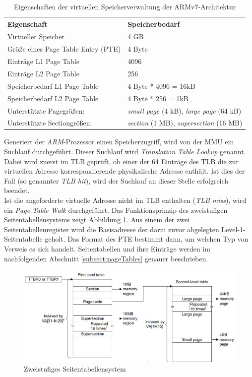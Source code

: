 \begin{table}[H]
\begin{tabular}{p{7cm} | p{7cm}}
  \textbf{Eigenschaft} & \textbf{Speicherbedarf} \\ \hline
  Virtueller Speicher & 4 GB\\  
  Größe eines Page Table Entry (PTE) & 4 Byte \\
  Einträge L1 Page Table & 4096\\
  Einträge L2 Page Table & 256\\
  Speicherbedarf L1 Page Table & 4 Byte * 4096 = 16kB \\
  Speicherbedarf L2 Page Table & 4 Byte * 256 = 1kB\\
  Unterstützte Pagegrößen: & \emph{small page} (4 kB), \emph{large page} (64 kB)\\
  Unterstützte Sectiongrößen: & \emph{section} (1 MB), \emph{supersection} (16 MB)\\
 \end{tabular}
 \caption{Eigenschaften der virtuellen Speicherverwaltung der ARMv7-Architektur}
 \label{table:GeneralVirtualMemory}
\end{table}

Generiert der \textit{ARM}-Prozessor einen Speicherzugriff, wird von der \ac{MMU} ein Suchlauf durchgeführt. Dieser Suchlauf wird \textit{Translation Table Lookup} genannt. Dabei wird zuerst im \ac{TLB} geprüft, ob einer der 64 Einträge des \ac{TLB} die zur virtuellen Adresse korrespondierende physikalische Adresse enthält. Ist dies der Fall (so genannter \textit{TLB hit}), wird der Suchlauf an dieser Stelle erfolgreich beendet.\\

Ist die angeforderte virtuelle Adresse nicht im \ac{TLB} enthalten (\textit{TLB miss}), wird ein \textit{Page Table Walk} durchgeführt. Das Funktionsprinzip des zweistufigen Seitentabellensystems zeigt Abbildung \ref{fig:2levelTableSystem}. Aus einem der zwei Seitentabellenregister wird die Basisadresse der darin zuvor abgelegten Level-1-Seitentabelle geholt. Das Format des \ac{PTE} bestimmt dann, um welchen Typ von Verweis es sich handelt. Seitentabellen und ihre Einträge werden im nachfolgenden Abschnitt \ref{subsect:pageTables} genauer beschrieben.\\

\begin{figure}[H]
	\includegraphics[scale=0.7]{chapters/mmu/figures/addressTranslation}
	\caption{Zweistufiges Seitentabellensystem \cite[S. B3-1325]{ARM:ARM}}
	\label{fig:2levelTableSystem}
\end{figure}


